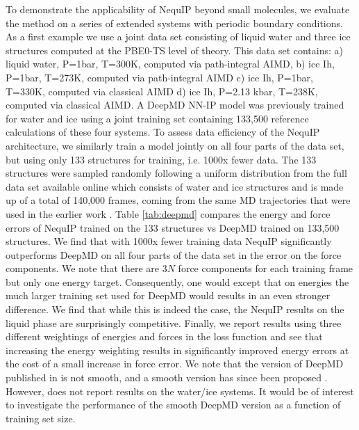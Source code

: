 \documentclass[11pt]{article}
\begin{document}
To demonstrate the applicability of NequIP beyond small molecules, we evaluate the method on a series of extended systems with periodic boundary conditions. As a first example we use a joint data set consisting of liquid water and three ice structures \cite{deepmd, deepmd_water_paper} computed at the PBE0-TS level of theory. This data set \cite{deepmd} contains: a) liquid water, P=1bar, T=300K, computed via path-integral AIMD, b) ice Ih, P=1bar, T=273K, computed via path-integral AIMD c) ice Ih, P=1bar, T=330K, computed via classical AIMD d) ice Ih, P=2.13 kbar, T=238K, computed via classical AIMD. A DeepMD NN-IP model was previously trained \cite{deepmd} for water and ice using a joint training set containing 133,500 reference calculations of these four systems. To assess data efficiency of the NequIP architecture, we similarly train a model jointly on all four parts of the data set, but using only 133 structures for training, i.e. 1000x fewer data. The 133 structures were sampled randomly following a uniform distribution from the full data set available online which consists of water and ice structures and is made up of a total of 140,000 frames, coming from the same MD trajectories that were used in the earlier work \cite{deepmd}. Table \ref{tab:deepmd} compares the energy and force errors of NequIP trained on the 133 structures vs DeepMD trained on 133,500 structures.  We find that with 1000x fewer training data NequIP significantly outperforms DeepMD on all four parts of the data set in the error on the force components. We note that there are $3N$ force components for each training frame but only one energy target. Consequently, one would except that on energies the much larger training set used for DeepMD would results in an even stronger difference. We find that while this is indeed the case, the NequIP results on the liquid phase are surprisingly competitive. Finally, we report results using three different weightings of energies and forces in the loss function and see that increasing the energy weighting results in significantly improved energy errors at the cost of a small increase in force error. We note that the version of DeepMD published in \cite{deepmd} is not smooth, and a smooth version has since been proposed \cite{zhang2018end}. However, \cite{zhang2018end} does not report results on the water/ice systems. It would be of interest to investigate the performance of the smooth DeepMD version as a function of training set size.
\end{document}
